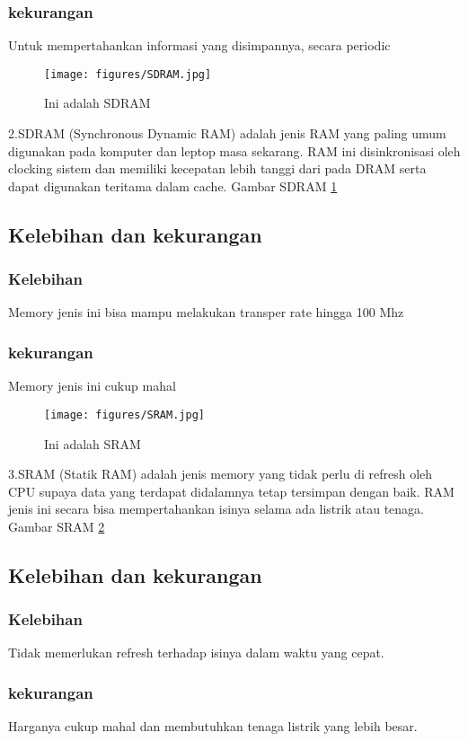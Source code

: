     \subsubsection{kekurangan}
    \-Untuk mempertahankan informasi yang disimpannya, secara periodic
    
  \begin{figure}[ht]
  \centerline{\texttt{[image: figures/SDRAM.jpg]}}
  \caption{Ini adalah SDRAM}
  \label{SDRAM}
  \end{figure}

2.SDRAM (Synchronous Dynamic RAM) adalah jenis RAM yang paling umum digunakan pada komputer dan leptop masa sekarang. RAM ini disinkronisasi oleh clocking sistem dan memiliki kecepatan lebih tanggi dari pada DRAM serta dapat digunakan teritama dalam cache.
Gambar SDRAM \ref{SDRAM}
    \subsection{Kelebihan dan kekurangan}
    \subsubsection{Kelebihan}
    \-Memory jenis ini bisa mampu melakukan transper rate hingga 100 Mhz
    \subsubsection{kekurangan}
    \-Memory jenis ini cukup mahal

  \begin{figure}[ht]
  \centerline{\texttt{[image: figures/SRAM.jpg]}}
  \caption{Ini adalah SRAM}
  \label{SRAM}
  \end{figure}

3.SRAM (Statik RAM) adalah jenis memory yang tidak perlu di refresh oleh CPU supaya data yang terdapat didalamnya tetap tersimpan dengan baik.
RAM jenis ini secara bisa mempertahankan isinya selama ada listrik atau tenaga.
Gambar SRAM \ref{SRAM}
  \subsection{Kelebihan dan kekurangan}
    \subsubsection{Kelebihan}
    \-Tidak memerlukan refresh terhadap isinya dalam waktu yang cepat.
    \subsubsection{kekurangan}
    \-Harganya cukup mahal dan membutuhkan tenaga listrik yang lebih besar.

